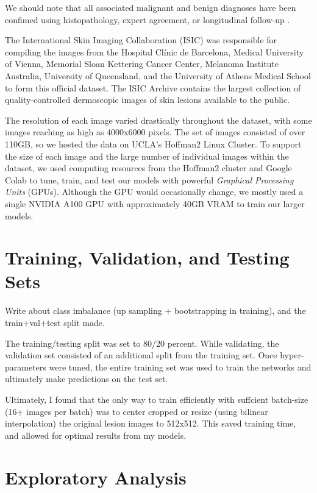 \documentclass [MAS] {uclathes}
\begin{document}
We should note that all associated malignant and benign diagnoses have been confimed using histopathology, expert agreement, or longitudinal follow-up \cite{ISIC}.

The International Skin Imaging Collaboration (ISIC) was responsible for compiling the images from the Hospital Clínic de Barcelona, Medical University of Vienna, Memorial Sloan Kettering Cancer Center, Melanoma Institute Australia, University of Queensland, and the University of Athens Medical School to form this official dataset. The ISIC Archive contains the largest collection of quality-controlled dermoscopic images of skin lesions available to the public. 

The resolution of each image varied drastically throughout the dataset, with some images reaching as high as 4000x6000 pixels. The set of images consisted of over 110GB, so we hosted the data on UCLA's Hoffman2 Linux Cluster. To support the size of each image and the large number of individual images within the dataset, we used computing resources from the Hoffman2 cluster and Google Colab to tune, train, and test our models with powerful \textit{Graphical Processing Units} (GPUs). Although the GPU would occasionally change, we mostly used a single NVIDIA A100 GPU with approximately 40GB VRAM to train our larger models.

\section{Training, Validation, and Testing Sets}

Write about class imbalance (up sampling + bootstrapping in training), and the train+val+test split made.

The training/testing split was set to 80/20 percent. While validating, the validation set consisted of an additional split from the training set. Once hyper-parameters were tuned, the entire training set was used to train the networks and ultimately make predictions on the test set.

Ultimately, I found that the only way to train efficiently with suffcient batch-size (16+ images per batch) was to center cropped or resize (using bilinear interpolation) the original lesion images to 512x512. This saved training time, and allowed for optimal results from my models. 

\section{Exploratory Analysis}
\end{document}
